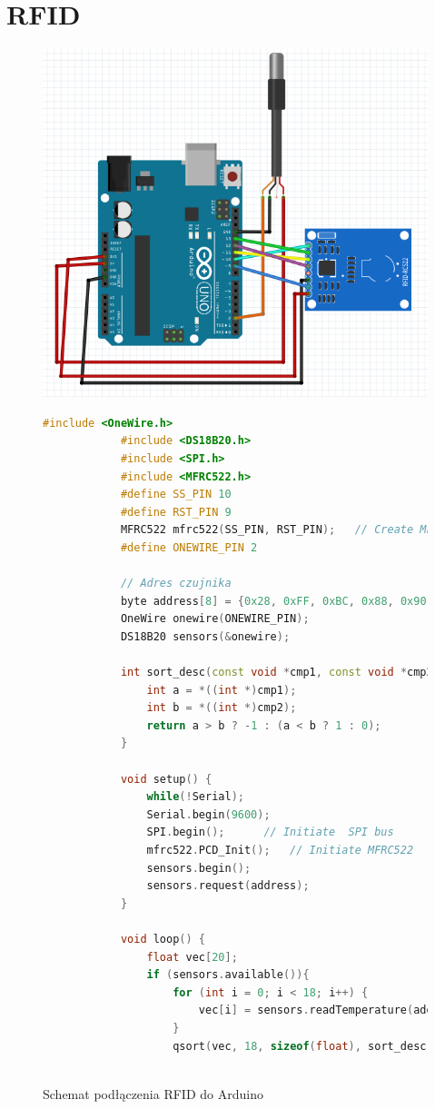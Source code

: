 \documentclass[polish,a4paper]{article}
\begin{document}
	\newpage
	\section{RFID}
	\begin{figure}[h!]
		\begin{center}
			\includegraphics[scale=0.4]{02_rfid_reader.png}
			\caption*{Schemat podłączenia RFID do Arduino}
		\end{center}
		\begin{lstlisting}[language=C++, basicstyle=\tiny]
			#include <OneWire.h>
			#include <DS18B20.h>
			#include <SPI.h>
			#include <MFRC522.h>
			#define SS_PIN 10
			#define RST_PIN 9
			MFRC522 mfrc522(SS_PIN, RST_PIN);   // Create MFRC522 instance.
			#define ONEWIRE_PIN 2
			
			// Adres czujnika
			byte address[8] = {0x28, 0xFF, 0xBC, 0x88, 0x90, 0x17, 0x5, 0x76};
			OneWire onewire(ONEWIRE_PIN);
			DS18B20 sensors(&onewire);
			
			int sort_desc(const void *cmp1, const void *cmp2){
				int a = *((int *)cmp1);
				int b = *((int *)cmp2);
				return a > b ? -1 : (a < b ? 1 : 0);
			}
			
			void setup() {
				while(!Serial);
				Serial.begin(9600);
				SPI.begin();      // Initiate  SPI bus
				mfrc522.PCD_Init();   // Initiate MFRC522
				sensors.begin();
				sensors.request(address);
			}
			
			void loop() {
				float vec[20];
				if (sensors.available()){
					for (int i = 0; i < 18; i++) {
						vec[i] = sensors.readTemperature(address);
					}
					qsort(vec, 18, sizeof(float), sort_desc);
					

\end{lstlisting}
\end{figure}
\end{document}

